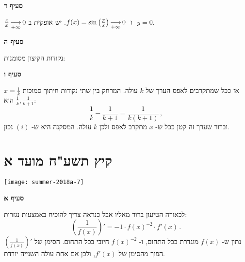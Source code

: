\textbf{סעיף ד}

$\frac{\pi}{x} \mathop{\longrightarrow}\limits_{+\infty} 0$
ו-%
$f(x)=\sin\left(\frac{\pi}{x}\right)\mathop{\longrightarrow}\limits_{+\infty} 0$.
יש
\asm{}
אופקית ב-%
$y=0$.

\textbf{סעיף ה}

נקודות הקיצון מסומנות:
\begin{center}
\end{center}

\vspace{-2ex}

\textbf{סעיף ו}

$x=\frac{1}{k}$
אז ככל שמתקרבים לאפס הערך של 
$k$
עולה. המרחק בין שתי נקודות חיתוך סמוכות
$\frac{1}{k},\frac{1}{k+1}$
הוא:
\[
\frac{1}{k}-\frac{1}{k+1}=\frac{1}{k(k+1)}\,,
\]
וברור שערך זה קטן ככל ש-%
$x$
מתקרב לאפס ולכן 
$k$
עולה. המסקנה היא ש-%
$(i)$
נכון.

\np



\section{קיץ תשע"ח מועד א}

\begin{center}
\texttt{[image: summer-2018a-7]}
\end{center}

\vspace{-2ex}

\textbf{סעיף א}

לכאורה הטיעון ברור מאליו אבל כנראה צריך להוכיח באמצעות נגזרות:
\[
\left(\frac{1}{f(x)}\right)'=-1\cdot f(x)^{-2} \cdot f'(x)\,.
\]
נתון ש-%
$f(x)$
מוגדרת בכל התחום, ו-%
$f(x)^{-2}$
חיובי בכל התחום. הסימן של
$\left(\frac{1}{f(x)}\right)'$
הפוך מהסימן של
$f'(x)$,
ולכן אם אחת עולה השנייה יורדת.

